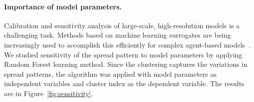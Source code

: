 \documentclass[11pt]{article}
\newcommand{\similarity}{\mathcal{S}}
\theoremstyle{definition}
\begin{document}
\paragraph{Importance of model parameters.} 
Calibration and sensitivity analysis of large-scale, high-resolution models
is a challenging task. Methods based on machine learning surrogates are
being increasingly used to accomplish this efficiently for complex
agent-based models~\cite{lamperti2018agent}. We studied sensitivity of the
spread pattern to model parameters by applying Random Forest learning
method. Since the clustering captures the variations in spread patterns,
the algorithm was applied with model parameters as independent variables
and cluster index as the dependent variable. The results are in
Figure~\ref{fig:sensitivity}.
\end{document}
